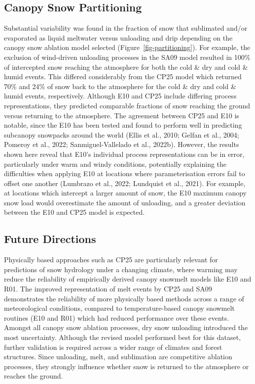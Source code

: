 \documentclass[
  letterpaper,
]{tex/uofsthesis-cs}
\begin{document}
\subsection{Canopy Snow Partitioning}\label{canopy-snow-partitioning-1}

Substantial variability was found in the fraction of snow that
sublimated and/or evaporated as liquid meltwater versus unloading and
drip depending on the canopy snow ablation model selected
(Figure~\ref{fig-partitioning}). For example, the exclusion of
wind-driven unloading processes in the SA09 model resulted in 100\% of
intercepted snow reaching the atmosphere for both the cold \& dry and
cold \& humid events. This differed considerably from the CP25 model
which returned 70\% and 24\% of snow back to the atmosphere for the cold
\& dry and cold \& humid events, respectively. Although E10 and CP25
include differing process representations, they predicted comparable
fractions of snow reaching the ground versus returning to the
atmosphere. The agreement between CP25 and E10 is notable, since the E10
has been tested and found to perform well in predicting subcanopy
snowpacks around the world (Ellis et al., 2010; Gelfan et al., 2004;
Pomeroy et al., 2022; Sanmiguel-Vallelado et al., 2022b). However, the
results shown here reveal that E10's individual process representations
can be in error, particularly under warm and windy conditions,
potentially explaining the difficulties when applying E10 at locations
where parameterisation errors fail to offset one another (Lumbrazo et
al., 2022; Lundquist et al., 2021). For example, at locations which
intercept a larger amount of snow, the E10 maximum canopy snow load
would overestimate the amount of unloading, and a greater deviation
between the E10 and CP25 model is expected.

\subsection{Future Directions}\label{future-directions}

Physically based approaches such as CP25 are particularly relevant for
predictions of snow hydrology under a changing climate, where warming
may reduce the reliability of empirically derived canopy snowmelt models
like E10 and R01. The improved representation of melt events by CP25 and
SA09 demonstrates the reliability of more physically based methods
across a range of meteorological conditions, compared to
temperature-based canopy snowmelt routines (E10 and R01) which had
reduced performance over these events. Amongst all canopy snow ablation
processes, dry snow unloading introduced the most uncertainty. Although
the revised model performed best for this dataset, further validation is
required across a wider range of climates and forest structures. Since
unloading, melt, and sublimation are competitive ablation processes,
they strongly influence whether snow is returned to the atmosphere or
reaches the ground.
\end{document}
